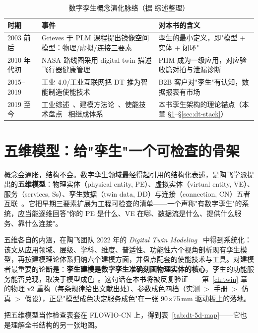 \begin{table}[htbp]
  \centering
  \caption{数字孪生概念演化脉络（据 \cite{Tao2019} 综述整理）}
  \label{tab:dt-history}
  \begin{tabular}{lp{5.0cm}p{4.6cm}}
    \toprule
    时期 & 事件 & 对本书的含义 \\
    \midrule
    2003 前后 & Grieves 于 PLM 课程提出镜像空间模型：物理/虚拟/连接三要素 & 孪生的最小定义，即"模型 + 实体 + 闭环" \\
    2010 年代初 & NASA 路线图采用 digital twin 描述飞行器健康管理 & PHM 成为一级应用，对应验收篇对拍与泄漏诊断 \\
    2015--2019 & 工业 4.0/工业互联网把 DT 推为智能制造使能技术 & B2B 客户对"孪生"有认知，数据报表有市场 \\
    2019 至今 & 工业综述~\cite{Tao2019}、建模方法论~\cite{Tao2022}、使能技术盘点~\cite{Qi2021} 相继成体系 & 本书孪生架构的理论锚点（本章 \S\ref{sec:dt-5d}--\S\ref{sec:dt-stack}） \\
    \bottomrule
  \end{tabular}
\end{table}

\section{五维模型：给"孪生"一个可检查的骨架}
\label{sec:dt-5d}

概念会通胀，结构不会。数字孪生领域最经得起引用的结构化表述，是陶飞学派提出的\textbf{五维模型}：物理实体（physical entity, PE）、虚拟实体（virtual entity, VE）、服务（services, Ss）、孪生数据（twin data, DD）与连接（connection, CN）五者互联~\cite{Qi2021}。它把早期三要素扩展为工程可检查的清单——一个声称"有数字孪生"的系统，应当能逐维回答"你的 PE 是什么、VE 在哪、数据流是什么、提供什么服务、靠什么连接"。

五维各自的内涵，在陶飞团队 2022 年的 \emph{Digital Twin Modeling}~\cite{Tao2022} 中得到系统化：该文从应用领域、层级、学科、维度、普适性、功能性六个视角剖析现有孪生模型，再按建模理论体系归纳六个建模方面，并盘点配套的使能技术与工具。对建模者最重要的论断是：\textbf{孪生建模是数字孪生准确刻画物理实体的核心}，孪生的功能服务能否兑现，取决于模型成色~\cite{Tao2022}。这句话在本书将被反复验证——第~\ref{ch:twin} 章的物理 v2 重构（每条规律给出文献出处）、参数成色四档（实测 $>$ 手册 $>$ 仿真 $>$ 假设），正是"模型成色决定服务成色"在一张 90$\times$75\,mm 驱动板上的落地。

把五维模型当作检查表套在 FLOWIO-CN 上，得到表~\ref{tab:dt-5d-map}——它也是理解全书结构的另一张地图。


